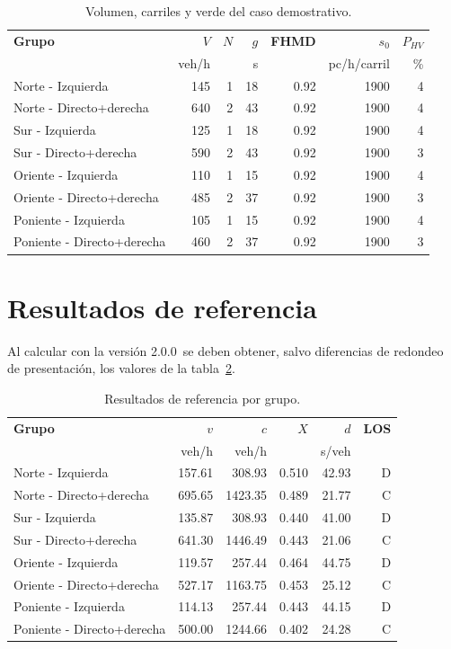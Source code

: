 \documentclass[11pt,letterpaper,oneside,openany]{report}
\newcommand{\softwareVersion}{2.0.0}
\begin{document}
\begin{table}[H]
\centering
\caption{Volumen, carriles y verde del caso demostrativo.}
\label{tab:demo-entradas}
\small
\begin{tabular}{@{}lrrrrrr@{}}
\toprule
\rowcolor{hcPale}
\textbf{Grupo} & \textbf{$V$} & \textbf{$N$} & \textbf{$g$} & \textbf{FHMD}
& \textbf{$s_0$} & \textbf{$P_{HV}$} \\
 & veh/h & & s & & pc/h/carril & \% \\
\midrule
Norte - Izquierda & 145 & 1 & 18 & 0.92 & 1900 & 4 \\
Norte - Directo+derecha & 640 & 2 & 43 & 0.92 & 1900 & 4 \\
Sur - Izquierda & 125 & 1 & 18 & 0.92 & 1900 & 4 \\
Sur - Directo+derecha & 590 & 2 & 43 & 0.92 & 1900 & 3 \\
Oriente - Izquierda & 110 & 1 & 15 & 0.92 & 1900 & 4 \\
Oriente - Directo+derecha & 485 & 2 & 37 & 0.92 & 1900 & 3 \\
Poniente - Izquierda & 105 & 1 & 15 & 0.92 & 1900 & 4 \\
Poniente - Directo+derecha & 460 & 2 & 37 & 0.92 & 1900 & 3 \\
\bottomrule
\end{tabular}
\end{table}

\section{Resultados de referencia}

Al calcular con la versión \softwareVersion\ se deben obtener, salvo diferencias
de redondeo de presentación, los valores de la tabla~\ref{tab:demo-salidas}.

\begin{table}[H]
\centering
\caption{Resultados de referencia por grupo.}
\label{tab:demo-salidas}
\small
\begin{tabular}{@{}lrrrrr@{}}
\toprule
\rowcolor{hcPale}
\textbf{Grupo} & \textbf{$v$} & \textbf{$c$} & \textbf{$X$} & \textbf{$d$} & \textbf{LOS} \\
 & veh/h & veh/h & & s/veh & \\
\midrule
Norte - Izquierda & 157.61 & 308.93 & 0.510 & 42.93 & D \\
Norte - Directo+derecha & 695.65 & 1423.35 & 0.489 & 21.77 & C \\
Sur - Izquierda & 135.87 & 308.93 & 0.440 & 41.00 & D \\
Sur - Directo+derecha & 641.30 & 1446.49 & 0.443 & 21.06 & C \\
Oriente - Izquierda & 119.57 & 257.44 & 0.464 & 44.75 & D \\
Oriente - Directo+derecha & 527.17 & 1163.75 & 0.453 & 25.12 & C \\
Poniente - Izquierda & 114.13 & 257.44 & 0.443 & 44.15 & D \\
Poniente - Directo+derecha & 500.00 & 1244.66 & 0.402 & 24.28 & C \\
\bottomrule
\end{tabular}
\end{table}
\end{document}
